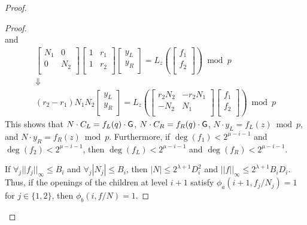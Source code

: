 \begin{proof}
\begin{proof}
\begin{equation*}
\end{equation*}
and
\begin{equation*}
\begin{array}{c}
\begin{bmatrix}
N_1 & 0 \\
0 & N_2 \\
\end{bmatrix} 
\begin{bmatrix}
1 & r_1 \\
1 & r_2 \\
\end{bmatrix} 
\begin{bmatrix}
y_L \\
y_R \\
\end{bmatrix} 
= 
L_z \left(
\begin{bmatrix}
f_1 \\
f_2\\
\end{bmatrix}
\right) \bmod p\\
\Downarrow\\
(r_2 - r_1) N_1 N_2 
\begin{bmatrix}
y_L \\
y_R \\
\end{bmatrix}
= 
L_z \left(
\begin{bmatrix}
r_2 N_2 & -r_2 N_1 \\
-N_2 & N_1 \\
\end{bmatrix}
\begin{bmatrix}
f_1 \\
f_2 \\
\end{bmatrix}
\right)
\bmod p
\end{array}
\end{equation*} 
This shows that $N \cdot C_L = f_L(q) \cdot \gr{G}$, $N \cdot C_R = f_R(q) \cdot \gr{G}$, $N \cdot y_L = f_L(z) \bmod p$, and $N \cdot y_R = f_R(z) \bmod p$. Furthermore, if $\deg(f_1) < 2^{\mu - i - 1}$ and $\deg(f_2) < 2^{\mu - i - 1}$, then $\deg(f_L) < 2^{\mu - i-1}$ and $\deg(f_R) < 2^{\mu -i -1}$. 


If $\forall _j ||f_j||_\infty \leq B_i$ and $\forall_j |N_j| \leq B_i$,  then $|N|  \leq 2^{\lambda + 1} D_i^2$ and $||f||_\infty \leq 2^{\lambda + 1} B_i D_i$. Thus, if the openings of the children at level $i+1$ satisfy $\phi_a(i+1, f_j/N_j) = 1$ for $j \in \{1, 2\}$, then $\phi_b(i, f/N) = 1$. %
\end{proof} 




\end{proof}
